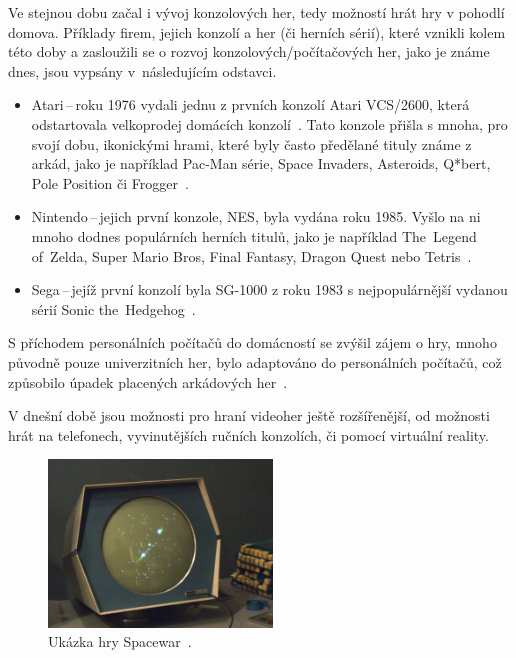 Ve stejnou dobu začal i vývoj konzolových her, tedy možností hrát hry v pohodlí domova. Příklady firem, jejich konzolí a her (či herních sérií), které vznikli kolem této doby a zasloužili se o rozvoj konzolových/počítačových her, jako je známe dnes, jsou vypsány v~následujícím odstavci.
\begin{itemize}
    \item Atari\,--\,roku 1976 vydali jednu z prvních konzolí Atari VCS/2600, která odstartovala velkoprodej domácích konzolí~\cite{novak2011game}. Tato konzole přišla s mnoha, pro svojí dobu, ikonickými hrami, které byly často předělané tituly známe z arkád, jako je například Pac-Man série, Space Invaders, Asteroids, Q*bert, Pole Position či Frogger~\cite{Atari_games}.
    \item Nintendo\,--\,jejich první konzole, NES, byla vydána roku 1985. Vyšlo na ni mnoho dodnes populárních herních titulů, jako je například The~Legend of~Zelda, Super Mario Bros, Final Fantasy, Dragon Quest nebo Tetris~\cite{NES_GAMES}.
    \item Sega\,--\,jejíž první konzolí byla SG-1000 z roku 1983 s nejpopulárnější vydanou sérií Sonic the~Hedgehog~\cite{SegaRetro_2023}.
\end{itemize}

S příchodem personálních počítačů do domácností se zvýšil zájem o hry, mnoho původně pouze univerzitních her, bylo adaptováno do personálních počítačů, což způsobilo úpadek placených arkádových her~\cite{novak2011game}. 

V dnešní době jsou možnosti pro hraní videoher ještě rozšířenější, od možnosti hrát na telefonech, vyvinutějších ručních konzolích, či pomocí virtuální reality.

\begin{figure}[H]
    \centering
	\includegraphics[width=0.53\textwidth]{obrazky-figures/ch2/Spacewar.png}
	\caption{Ukázka hry Spacewar~\cite{bellis2019spacewar}.}
	\label{fig:spacewar}
\end{figure}

